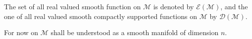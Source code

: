 \documentclass[10pt]{book}
\newcommand{\Dcal}{\mathcal{D}}
\newcommand{\Ecal}{\mathcal{E}}
\newcommand{\Mcal}{\mathcal{M}}
\newcommand{\Rbb}{\mathbb{R}}
\theoremstyle{break}
\begin{document}
The set of all real valued smooth function on $\Mcal$ is denoted by $\Ecal(\Mcal)$, and the one of all real valued smooth compactly supported functions on $\Mcal$ by $\Dcal(\Mcal)$. 


%
%
%
%
%
%
\bigskip


For now on $\Mcal$ shall be understood as a smooth manifold of dimension $n$. 


\bigskip
\end{document}
